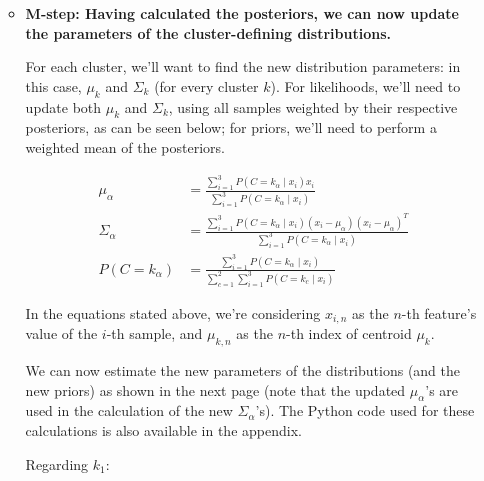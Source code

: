 \documentclass[12pt]{article}
\begin{document}
\begin{enumerate}[leftmargin=\labelsep]
\begin{itemize}[leftmargin=]
\begin{paracol}{2}
                \end{paracol}

          \item \textbf{M-step: Having calculated the posteriors, we can now
                  update the parameters of the cluster-defining distributions.}

                For each cluster, we'll want to find the new distribution parameters:
                in this case, $\mu_k$ and $\Sigma_k$ (for every cluster $k$).
                For likelihoods, we'll need to update both $\mu_k$ and $\Sigma_k$,
                using all samples weighted by their respective posteriors, as can be seen below;
                for priors, we'll need to perform a weighted mean of the posteriors.

                \begin{equation*}
                  \begin{aligned}
                    \mu_\alpha      & = \frac{\sum_{i=1}^3 P(C = k_\alpha \mid x_i) x_i}{\sum_{i=1}^3 P(C = k_\alpha \mid x_i)}                                             \\
                    \Sigma_\alpha   & = \frac{\sum_{i=1}^3 P(C = k_\alpha \mid x_i) (x_{i} - \mu_{\alpha}) (x_{i} - \mu_{\alpha})^T}{\sum_{i=1}^3 P(C = k_\alpha \mid x_i)} \\
                    P(C = k_\alpha) & = \frac{\sum_{i=1}^3 P(C = k_\alpha \mid x_i)}{\sum_{c=1}^2\sum_{i=1}^3 P(C = k_c \mid x_i)}
                  \end{aligned}
                \end{equation*}

                In the equations stated above, we're considering $x_{i, n}$ as the $n$-th
                feature's value of the $i$-th sample, and $\mu_{k, n}$ as the $n$-th
                index of centroid $\mu_k$.

                We can now estimate the new parameters of the distributions (and the new
                priors) as shown in the next page (note that the updated $\mu_\alpha$'s are used
                in the calculation of the new $\Sigma_\alpha$'s).
                The Python code used for these calculations is also
                available in the appendix.

                \pagebreak

                Regarding $k_1$:


\end{itemize}
\end{enumerate}
\end{document}
